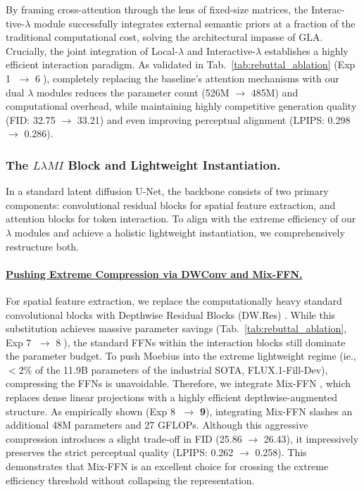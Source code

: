\documentclass[runningheads]{llncs}
\begin{document}
\vspace{-0.5em}
By framing cross-attention through the lens of fixed-size matrices, the Interac- tive-$\lambda$ module successfully integrates external semantic priors at a fraction of the traditional computational cost, solving the architectural impasse of GLA. Crucially, the joint integration of Local-$\lambda$ and Interactive-$\lambda$ establishes a highly efficient interaction paradigm. As validated in Tab.~\ref{tab:rebuttal_ablation} (Exp \textcircled{\small 1} $\rightarrow$ \textcircled{\small 6}), completely replacing the baseline's attention mechanisms with our dual $\lambda$ modules reduces the parameter count (526M $\rightarrow$ 485M) and computational overhead, while maintaining highly competitive generation quality (FID: 32.75 $\rightarrow$ 33.21) and even improving perceptual alignment (LPIPS: 0.298 $\rightarrow$ 0.286).

\vspace{-1em}
\subsubsection{The $L\lambda MI$ Block and Lightweight Instantiation.}\label{sec:llm_instantiation}
In a standard latent diffusion U-Net, the backbone consists of two primary components: convolutional residual blocks for spatial feature extraction, and attention blocks for token interaction. To align with the extreme efficiency of our $\lambda$ modules and achieve a holistic lightweight instantiation, we comprehensively restructure both.

\vspace{-0.5em}
\paragraph{\underline{Pushing Extreme Compression via DWConv and Mix-FFN.}}
For spatial feature extraction, we replace the computationally heavy standard convolutional blocks with Depthwise Residual Blocks (DW.Res) \cite{Sandler2018MobileNetV2}. While this substitution achieves massive parameter savings (Tab.~\ref{tab:rebuttal_ablation}, Exp \textcircled{\small 7} $\rightarrow$ \textcircled{\small 8}), the standard FFNs within the interaction blocks still dominate the parameter budget. To push Moebius into the extreme lightweight regime (ie., $<2\%$ of the 11.9B parameters of the industrial SOTA, FLUX.1-Fill-Dev), compressing the FFNs is unavoidable. Therefore, we integrate Mix-FFN \cite{xie2024sana, xie2025sana}, which replaces dense linear projections with a highly efficient depthwise-augmented structure. As empirically shown (Exp \textcircled{\small 8} $\rightarrow$ \textcircled{\small \textbf{9}}), integrating Mix-FFN slashes an additional 48M parameters and 27 GFLOPs. Although this aggressive compression introduces a slight trade-off in FID (25.86 $\rightarrow$ 26.43), it impressively preserves the strict perceptual quality (LPIPS: 0.262 $\rightarrow$ 0.258). This demonstrates that Mix-FFN is an excellent choice for crossing the extreme efficiency threshold without collapsing the representation.
\end{document}
